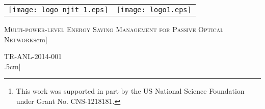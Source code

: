 \documentclass[11pt,english,12pt,onecolumn, draftcls]{IEEEtran}
\theoremstyle{plain}
\theoremstyle{definition}
\begin{document}
\begin{titlepage}


\begin{tabular}{l        r}

\texttt{[image: logo\_njit\_1.eps]} \hspace{6cm} & \texttt{[image: logo1.eps]}

\end{tabular}

\vspace{2cm}






\begin{center}


\textsc{\LARGE Multi-power-level Energy Saving Management for Passive Optical Networks}\3cm] 





{}
{\textsc{TR-ANL-2014-001}\\
\large {}}\1.5cm]
\vfill

\end{center}

\end{titlepage}



\author{





\thanks{This work was supported in part by the US National Science Foundation under Grant No. CNS-1218181.}


}
\end{document}
